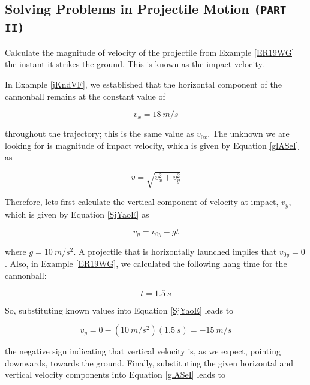 \documentclass[main-physics.tex]{subfiles}
\begin{document}
\subsection{Solving Problems in Projectile Motion \texttt{(PART II)}}

\begin{example}
    Calculate the magnitude of velocity of the projectile from Example \ref{ER19WG} the instant it strikes the ground. This is known as the impact velocity.
\end{example}

\Solution In Example \ref{jKndVF}, we established that the horizontal component of the cannonball remains at the constant value of

\begin{equation*}
    v_x = \SI{18}{m/s}
\end{equation*}

throughout the trajectory; this is the same value as $v_{0x}$. The unknown we are looking for is magnitude of impact velocity, which is given by Equation \eqref{glASeI} as

\begin{equation*}
    v = \sqrt{v_x^2 + v_y^2}
\end{equation*}

Therefore, lets first calculate the vertical component of velocity at impact, $v_y$, which is given by Equation \eqref{SjYaoE} as

\begin{equation*}
    v_y = v_{0y} - gt
\end{equation*}

where $g = \SI{10}{m/s^2}$. A projectile that is horizontally launched implies that $v_{0y} = 0$. Also, in Example \ref{ER19WG}, we calculated the following hang time for the cannonball:

\begin{equation*}
    t = \SI{1.5}{s}
\end{equation*}

So, substituting known values into Equation \eqref{SjYaoE} leads to 

\begin{equation*}
    v_y = 0 - (\SI{10}{m/s^2})(\SI{1.5}{s}) = -\SI{15}{m/s} 
\end{equation*}

the negative sign indicating that vertical velocity is, as we expect, pointing downwards, towards the ground. Finally, substituting the given horizontal and vertical velocity components into Equation \eqref{glASeI} leads to
\end{document}
